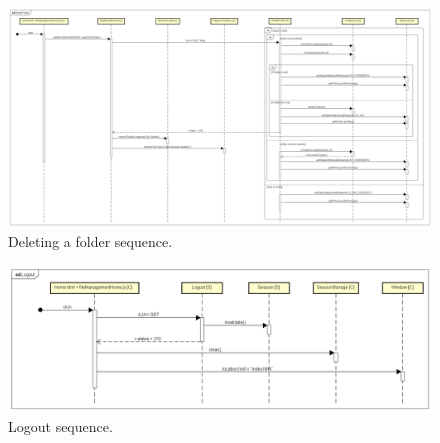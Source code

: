 \documentclass[a4paper,12pt]{article}
\begin{document}
\begin{figure}[H]
    \centering
     \includegraphics[width=1.0\textwidth]{JS/SequenceDiagram/DeleteFolder.png}
    \caption{Deleting a folder sequence.}
\end{figure}
    
\begin{figure}[H]
    \centering
     \includegraphics[width=1.0\textwidth]{JS/SequenceDiagram/Logout.png}
    \caption{Logout sequence.}
\end{figure}

\newpage
\end{document}
